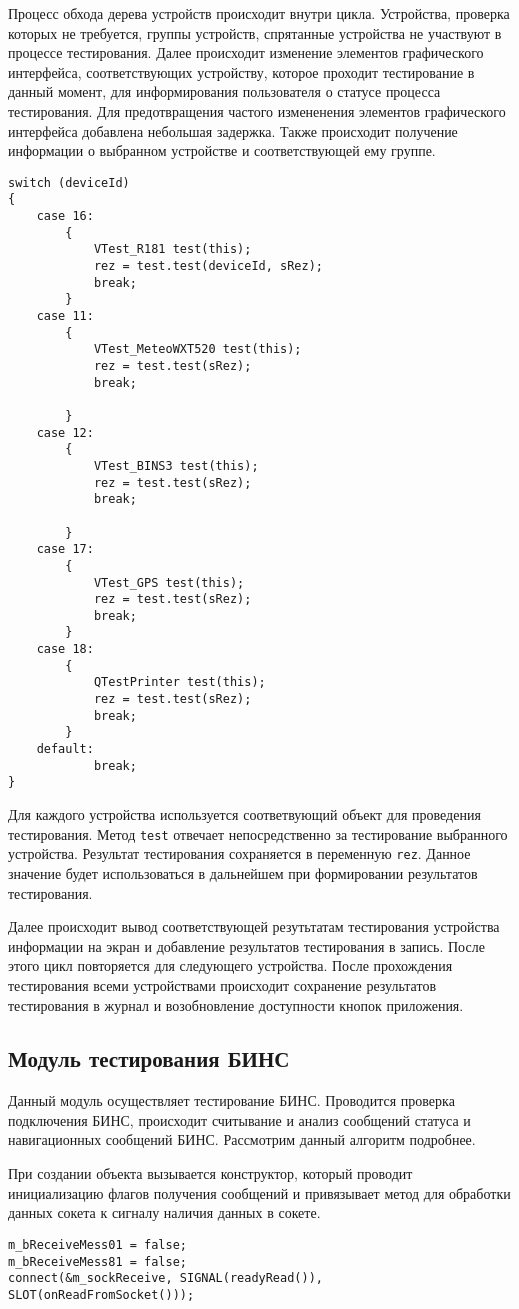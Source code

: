Процесс обхода дерева устройств происходит внутри цикла. Устройства, проверка которых не требуется, группы устройств,
спрятанные устройства  не участвуют в процессе тестирования. Далее происходит изменение элементов графического
интерфейса, соответствующих устройству, которое проходит тестирование в данный момент, для информирования пользователя о
статусе процесса тестирования. Для предотвращения частого измененения элементов графического интерфейса добавлена
небольшая задержка. Также происходит получение информации о выбранном устройстве и соответствующей ему группе.
\medskip
\begin{verbatim}
switch (deviceId)
{
	case 16:
		{
			VTest_R181 test(this);
			rez = test.test(deviceId, sRez);
			break;
		}
	case 11:
		{
			VTest_MeteoWXT520 test(this);
			rez = test.test(sRez);
			break;

		}
	case 12:
		{
			VTest_BINS3 test(this);
			rez = test.test(sRez);
			break;

		}
	case 17:
		{
			VTest_GPS test(this);
			rez = test.test(sRez);
			break;
		}
	case 18:
		{
			QTestPrinter test(this);
			rez = test.test(sRez);
			break;
		}
	default:
			break;
}
\end{verbatim}
\medskip

Для каждого устройства используется соответвующий объект для проведения тестирования. Метод \texttt{test} отвечает
непосредственно за тестирование выбранного устройства. Результат тестирования сохраняется в переменную \texttt{rez}.
Данное значение будет использоваться в дальнейшем при формировании результатов тестирования.

Далее происходит вывод соответствующей резутьтатам тестирования устройства информации на экран и добавление результатов
тестирования в запись. После этого цикл повторяется для следующего устройства. После прохождения тестирования всеми
устройствами происходит сохранение результатов тестирования в журнал и возобновление доступности кнопок приложения.

\subsection{Модуль тестирования БИНС}
Данный модуль осуществляет тестирование БИНС. Проводится проверка подключения БИНС, происходит считывание и анализ
сообщений статуса и навигационных сообщений БИНС. Рассмотрим данный алгоритм подробнее.

При создании объекта вызывается конструктор, который проводит инициализацию флагов получения сообщений и привязывает
метод для обработки данных сокета к сигналу наличия данных в сокете.
\medskip
\begin{verbatim}
m_bReceiveMess01 = false;
m_bReceiveMess81 = false;
connect(&m_sockReceive, SIGNAL(readyRead()), SLOT(onReadFromSocket()));
\end{verbatim}
\medskip

